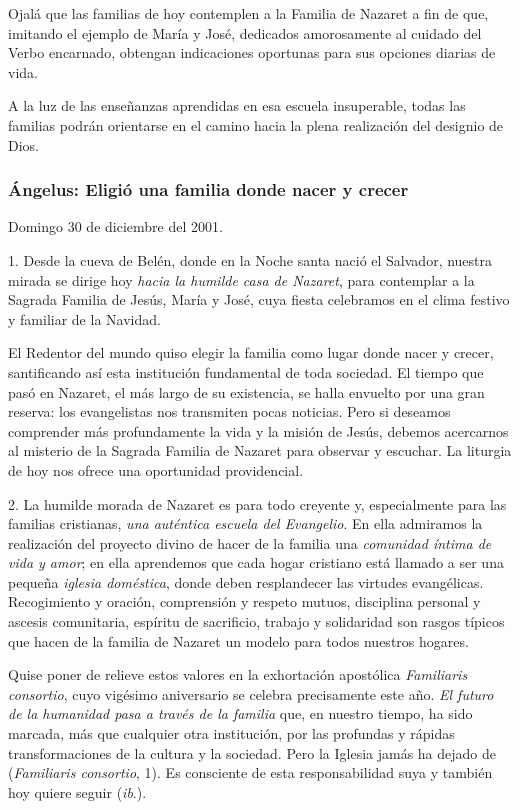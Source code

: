 Ojalá que las familias de hoy contemplen a la Familia de Nazaret a fin de que, imitando el ejemplo de María y José, dedicados amorosamente al cuidado del Verbo encarnado, obtengan indicaciones oportunas para sus opciones diarias de vida.

A la luz de las enseñanzas aprendidas en esa escuela insuperable, todas las familias podrán orientarse en el camino hacia la plena realización del designio de Dios.

\subsubsection{Ángelus: Eligió una familia donde nacer y crecer}

Domingo 30 de diciembre del 2001.

1. Desde la cueva de Belén, donde en la Noche santa nació el Salvador, nuestra mirada se dirige hoy \emph{hacia la humilde casa de Nazaret}, para contemplar a la Sagrada Familia de Jesús, María y José, cuya fiesta celebramos en el clima festivo y familiar de la Navidad.

El Redentor del mundo quiso elegir la familia como lugar donde nacer y crecer, santificando así esta institución fundamental de toda sociedad. El tiempo que pasó en Nazaret, el más largo de su existencia, se halla envuelto por una gran reserva: los evangelistas nos transmiten pocas noticias. Pero si deseamos comprender más profundamente la vida y la misión de Jesús, debemos acercarnos al misterio de la Sagrada Familia de Nazaret para observar y escuchar. La liturgia de hoy nos ofrece una oportunidad providencial.

2. La humilde morada de Nazaret es para todo creyente y, especialmente para las familias cristianas, \emph{una auténtica escuela del Evangelio}. En ella admiramos la realización del proyecto divino de hacer de la familia una \emph{comunidad íntima de vida y amor}; en ella aprendemos que cada hogar cristiano está llamado a ser una pequeña \emph{iglesia doméstica}, donde deben resplandecer las virtudes evangélicas. Recogimiento y oración, comprensión y respeto mutuos, disciplina personal y ascesis comunitaria, espíritu de sacrificio, trabajo y solidaridad son rasgos típicos que hacen de la familia de Nazaret un modelo para todos nuestros hogares.

Quise poner de relieve estos valores en la exhortación apostólica \emph{Familiaris consortio}, cuyo vigésimo aniversario se celebra precisamente este año. \emph{El futuro de la humanidad pasa a través de la familia} que, en nuestro tiempo, ha sido marcada, más que cualquier otra institución, por las profundas y rápidas transformaciones de la cultura y la sociedad. Pero la Iglesia jamás ha dejado de  (\emph{Familiaris consortio}, 1). Es consciente de esta responsabilidad suya y también hoy quiere seguir  (\emph{ib}.).

